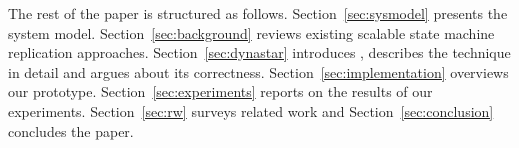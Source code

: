 
The rest of the paper is structured as follows.
Section~\ref{sec:sysmodel} presents the system model.
Section~\ref{sec:background} reviews existing scalable state machine replication approaches.
Section~\ref{sec:dynastar} introduces \dynastar, describes the technique in detail and argues about its correctness.
Section~\ref{sec:implementation} overviews our prototype.
Section~\ref{sec:experiments} reports on the results of our experiments.
Section~\ref{sec:rw} surveys related work and
Section~\ref{sec:conclusion} concludes the paper.

